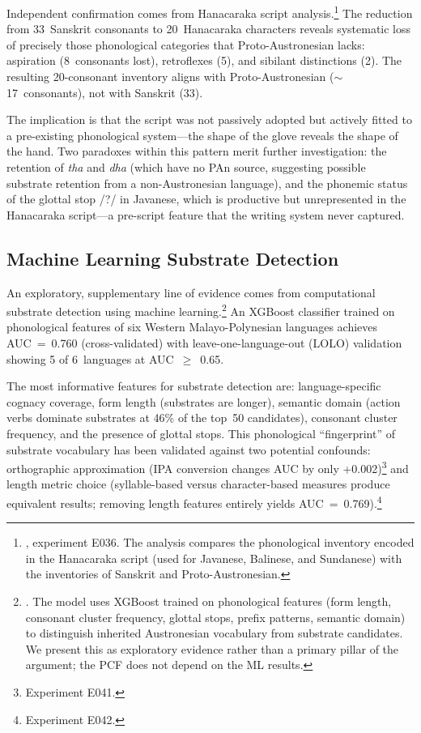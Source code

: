 \documentclass[12pt,a4paper]{article}
\begin{document}
Independent confirmation comes from Hanacaraka script analysis.\footnote{\autocite{amien2026d}, experiment E036. The analysis compares the phonological inventory encoded in the Hanacaraka script (used for Javanese, Balinese, and Sundanese) with the inventories of Sanskrit and Proto-Austronesian.} The reduction from 33~Sanskrit consonants to 20~Hanacaraka characters reveals systematic loss of precisely those phonological categories that Proto-Austronesian lacks: aspiration (8~consonants lost), retroflexes (5), and sibilant distinctions (2). The resulting 20-consonant inventory aligns with Proto-Austronesian ($\sim$17~consonants), not with Sanskrit (33).

The implication is that the script was not passively adopted but actively fitted to a pre-existing phonological system---the shape of the glove reveals the shape of the hand. Two paradoxes within this pattern merit further investigation: the retention of \emph{tha} and \emph{dha} (which have no PAn source, suggesting possible substrate retention from a non-Austronesian language), and the phonemic status of the glottal stop /?/ in Javanese, which is productive but unrepresented in the Hanacaraka script---a pre-script feature that the writing system never captured.

\subsection{Machine Learning Substrate Detection}

An exploratory, supplementary line of evidence comes from computational substrate detection using machine learning.\footnote{\autocite{amien2026d}. The model uses XGBoost trained on phonological features (form length, consonant cluster frequency, glottal stops, prefix patterns, semantic domain) to distinguish inherited Austronesian vocabulary from substrate candidates. We present this as exploratory evidence rather than a primary pillar of the argument; the PCF does not depend on the ML results.} An XGBoost classifier trained on phonological features of six Western Malayo-Polynesian languages achieves AUC~=~0.760 (cross-validated) with leave-one-language-out (LOLO) validation showing 5 of 6~languages at AUC~$\geq$~0.65.

The most informative features for substrate detection are: language-specific cognacy coverage, form length (substrates are longer), semantic domain (action verbs dominate substrates at 46\% of the top~50 candidates), consonant cluster frequency, and the presence of glottal stops. This phonological ``fingerprint'' of substrate vocabulary has been validated against two potential confounds: orthographic approximation (IPA conversion changes AUC by only +0.002)\footnote{Experiment E041.} and length metric choice (syllable-based versus character-based measures produce equivalent results; removing length features entirely yields AUC~=~0.769).\footnote{Experiment E042.}
\end{document}

